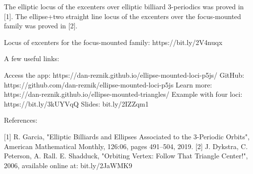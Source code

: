 The elliptic locus of the excenters over elliptic billiard 3-periodics was proved in [1]. The ellipse+two straight line locus of the excenters over the focus-mounted family was proved in [2].

Locus of excenters for the focus-mounted family: https://bit.ly/2V4nuqx

A few useful links: 

Access the app: https://dan-reznik.github.io/ellipse-mounted-loci-p5js/
GitHub: https://github.com/dan-reznik/ellipse-mounted-loci-p5js
Learn more: https://dan-reznik.github.io/ellipse-mounted-triangles/
Example with four loci: https://bit.ly/3kUYVqQ
Slides: bit.ly/2IZZqm1

References:

[1] R. Garcia, "Elliptic Billiards and Ellipses Associated to the 3-Periodic Orbits", American Mathematical Monthly, 126:06, pages 491--504, 2019.
[2]  J. Dykstra, C. Peterson, A. Rall. E. Shadduck, "Orbiting Vertex: Follow That Triangle Center!", 2006, available online at: bit.ly/2JaWMK9